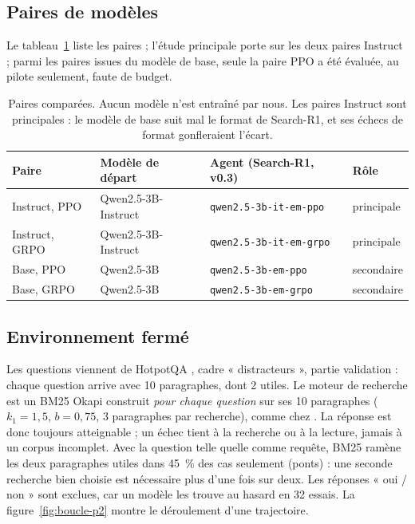 \documentclass[11pt,a4paper]{article}
\begin{document}
\subsection{Paires de modèles}

Le tableau~\ref{tab:paires} liste les paires ; l'étude principale porte sur les deux paires Instruct ; parmi les paires issues du modèle de base, seule la paire PPO a été évaluée, au pilote seulement, faute de budget.

\begin{table}[h]\centering\small
\begin{tabular}{llll}\toprule
Paire & Modèle de départ & Agent (Search-R1, v0.3) & Rôle\\\midrule
Instruct, PPO & Qwen2.5-3B-Instruct & \texttt{qwen2.5-3b-it-em-ppo} & principale\\
Instruct, GRPO & Qwen2.5-3B-Instruct & \texttt{qwen2.5-3b-it-em-grpo} & principale\\
Base, PPO & Qwen2.5-3B & \texttt{qwen2.5-3b-em-ppo} & secondaire\\
Base, GRPO & Qwen2.5-3B & \texttt{qwen2.5-3b-em-grpo} & secondaire\\\bottomrule
\end{tabular}
\caption{Paires comparées. Aucun modèle n'est entraîné par nous. Les paires Instruct sont principales : le modèle de base suit mal le format de Search-R1, et ses échecs de format gonfleraient l'écart.}
\label{tab:paires}\end{table}

\subsection{Environnement fermé}

Les questions viennent de HotpotQA \citep{yang2018hotpotqa}, cadre « distracteurs », partie validation : chaque question arrive avec 10 paragraphes, dont 2 utiles. Le moteur de recherche est un BM25 Okapi construit \emph{pour chaque question} sur ses 10 paragraphes ($k_1 = 1{,}5$, $b = 0{,}75$, 3 paragraphes par recherche), comme chez \citet{zhai2026does}. La réponse est donc toujours atteignable ; un échec tient à la recherche ou à la lecture, jamais à un corpus incomplet. Avec la question telle quelle comme requête, BM25 ramène les deux paragraphes utiles dans 45~\% des cas seulement (ponts) : une seconde recherche bien choisie est nécessaire plus d'une fois sur deux. Les réponses « oui / non » sont exclues, car un modèle les trouve au hasard en 32 essais. La figure~\ref{fig:boucle-p2} montre le déroulement d'une trajectoire.
\end{document}
